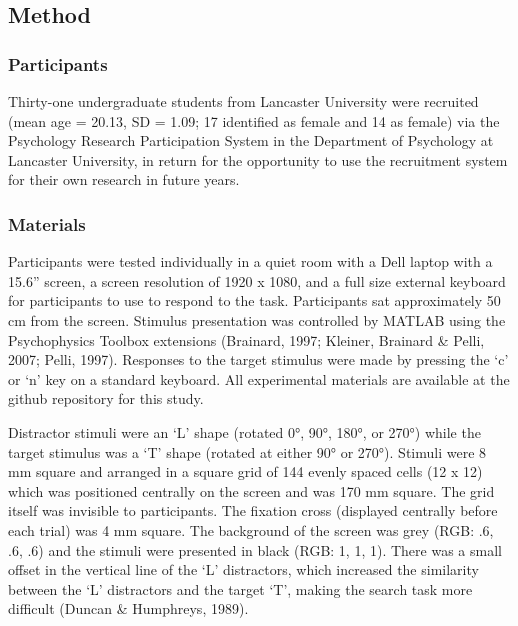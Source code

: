 \documentclass[
  man,floatsintext]{apa7}
\begin{document}
\hypertarget{method}{%
\subsection{Method}\label{method}}

\hypertarget{participants}{%
\subsubsection{Participants}\label{participants}}

Thirty-one undergraduate students from Lancaster University were recruited (mean age = 20.13, SD = 1.09; 17 identified as female and 14 as female) via the Psychology Research Participation System in the Department of Psychology at Lancaster University, in return for the opportunity to use the recruitment system for their own research in future years.

\hypertarget{materials}{%
\subsubsection{Materials}\label{materials}}

Participants were tested individually in a quiet room with a Dell laptop with a 15.6'' screen, a screen resolution of 1920 x 1080, and a full size external keyboard for participants to use to respond to the task. Participants sat approximately 50 cm from the screen. Stimulus presentation was controlled by MATLAB using the Psychophysics Toolbox extensions (Brainard, 1997; Kleiner, Brainard \& Pelli, 2007; Pelli, 1997). Responses to the target stimulus were made by pressing the `c' or `n' key on a standard keyboard. All experimental materials are available at the github repository for this study.

Distractor stimuli were an `L' shape (rotated 0°, 90°, 180°, or 270°) while the target stimulus was a `T' shape (rotated at either 90° or 270°). Stimuli were 8 mm square and arranged in a square grid of 144 evenly spaced cells (12 x 12) which was positioned centrally on the screen and was 170 mm square. The grid itself was invisible to participants. The fixation cross (displayed centrally before each trial) was 4 mm square. The background of the screen was grey (RGB: .6, .6, .6) and the stimuli were presented in black (RGB: 1, 1, 1). There was a small offset in the vertical line of the `L' distractors, which increased the similarity between the `L' distractors and the target `T', making the search task more difficult (Duncan \& Humphreys, 1989).
\end{document}
